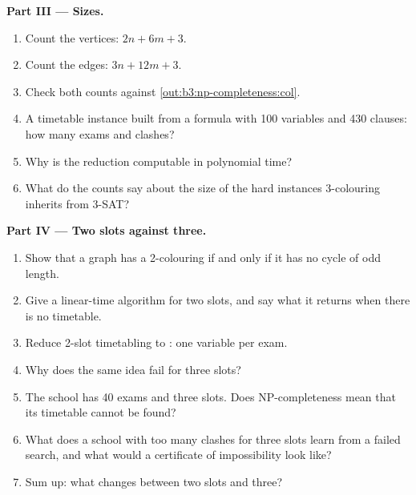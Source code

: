 \begin{problem}
\medskip\noindent\textbf{Part III --- Sizes.}
\begin{enumerate}[resume]
  \item Count the vertices: $2n + 6m + 3$.
  \item Count the edges: $3n + 12m + 3$.
  \item Check both counts against \cref{out:b3:np-completeness:col}.
  \item A timetable instance built from a formula with 100 variables and 430 clauses: how many exams and clashes?
  \item Why is the reduction computable in polynomial time?
  \item What do the counts say about the size of the hard instances 3-colouring inherits from 3-SAT?
\end{enumerate}

\medskip\noindent\textbf{Part IV --- Two slots against three.}
\begin{enumerate}[resume]
  \item Show that a graph has a 2-colouring if and only if it has no cycle of odd length.
  \item Give a linear-time algorithm for two slots, and say what it returns when there is no timetable.
  \item Reduce 2-slot timetabling to : one variable per exam.
  \item Why does the same idea fail for three slots?
  \item The school has 40 exams and three slots. Does NP-completeness mean that its timetable cannot be found?
  \item What does a school with too many clashes for three slots learn from a failed search, and what would a certificate of impossibility look like?
  \item Sum up: what changes between two slots and three?
\end{enumerate}
\end{problem}
